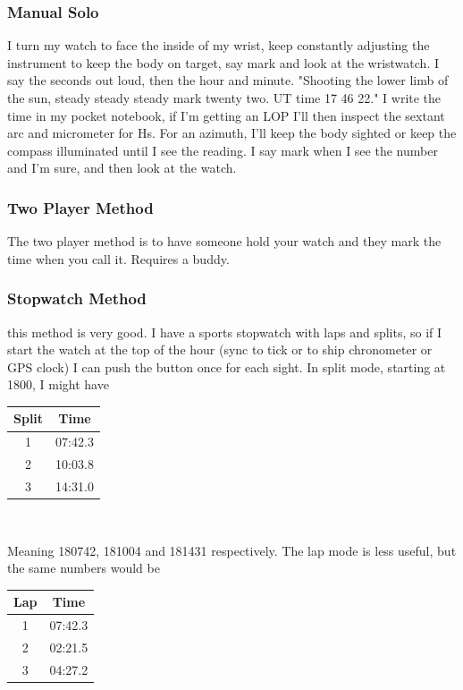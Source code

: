 \documentclass[letterpaper,12pt]{article}
\begin{document}
\subsubsection*{Manual Solo}
I turn my watch to face the inside of my wrist, keep constantly adjusting the instrument to keep the body on target, say mark and look at the wristwatch.
I say the seconds out loud, then the hour and minute.
"Shooting the lower limb of the sun, steady steady steady mark twenty two. UT time 17 46 22."
I write the time in my pocket notebook, if I'm getting an LOP I'll then inspect the sextant arc and micrometer for Hs.
For an azimuth, I'll keep the body sighted or keep the compass illuminated until I see the reading.
I say mark when I see the number and I'm sure, and then look at the watch.
\subsubsection*{Two Player Method}
The two player method is to have someone hold your watch and they mark the time when you call it. Requires a buddy.
\subsubsection*{Stopwatch Method}
this method is very good. I have a sports stopwatch with laps and splits, so if I start the watch at the top of the hour (sync to tick or to ship chronometer or GPS clock) I can push the button once for each sight. In split mode, starting at 1800, I might have

\bigskip

\begin{centering}
\begin{tabular}{|c|c|}
	\hline
	Split & Time \\
	\hline
	1& 07:42.3 \\
	\hline
	2& 10:03.8 \\
	\hline
	3& 14:31.0 \\
	\hline
\end{tabular}\\
\bigskip

Meaning 180742, 181004 and 181431 respectively.
The lap mode is less useful, but the same numbers would be

\bigskip
\begin{tabular}{|c|c|}
	\hline
	Lap & Time \\
	\hline
	1& 07:42.3 \\
	\hline
	2& 02:21.5 \\
	\hline
	3& 04:27.2 \\
	\hline
\end{tabular}\\
\end{centering}
\end{document}
